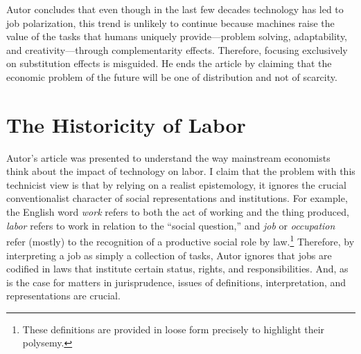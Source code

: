 \documentclass[version=last,draft=false,paper=A4,portrait,twoside=true,twocolumn=false,headinclude=false,footinclude=false,mpinclude=true,fontsize=12,BCOR=20mm,DIV=calc,pagesize=auto,open=right,chapterprefix=true,numbers=autoendperiod,headsepline=false,headings=twolinechapter,parskip=false]{scrbook}
\begin{document}
Autor concludes that even though in the last few decades technology has led
to job polarization, this trend is unlikely to continue because machines
raise the value of the tasks that humans uniquely provide---problem
solving, adaptability, and creativity---through complementarity effects.
Therefore, focusing exclusively on substitution effects is misguided. He
ends the article by claiming that the economic problem of the future will
be one of distribution and not of scarcity.


\section{The Historicity of Labor}
\label{sec:orgde59c1a}

Autor's article was presented to understand the way mainstream economists
think about the impact of technology on labor. I claim that the problem
with this technicist view is that by relying on a realist epistemology, it
ignores the crucial conventionalist character of social representations and
institutions. For example, the English word \emph{work} refers to both the act of
working and the thing produced, \emph{labor} refers to work in relation to the
``social question,'' and \emph{job} or \emph{occupation} refer (mostly) to the
recognition of a productive social role by law.\footnote{These definitions are provided in loose form precisely to highlight
their polysemy.} Therefore, by
interpreting a job as simply a collection of tasks, Autor ignores that jobs
are codified in laws that institute certain status, rights, and
responsibilities. And, as is the case for matters in jurisprudence, issues
of definitions, interpretation, and representations are crucial.
\end{document}

